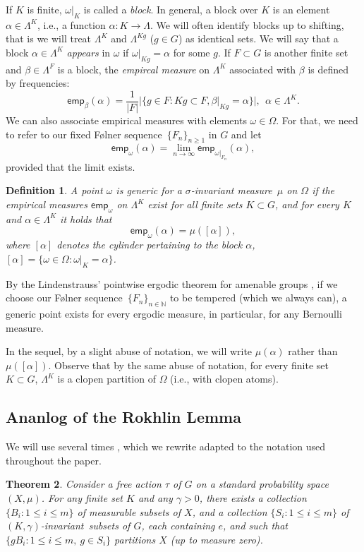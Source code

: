 \documentclass{amsart}
\newtheorem{thm}{Theorem}[section]
\newtheorem{defn}[thm]{Definition}
\theoremstyle{remark}
\def \N {\mathbb N}
\def \sq {sequence}
\def \im {invariant measure}
\def \inv {invariant}
\def \emp{\mathsf{emp}}
\begin{document}
If $K$ is finite, $\omega|_K$ is called a \emph{block}. In general, a block over $K$ is an element $\alpha\in\Lambda^K$, i.e., a function $\alpha:K\to\Lambda$. We will often identify blocks up to shifting, that is we will treat $\Lambda^K$ and $\Lambda^{Kg}$ ($g\in G$) as identical sets.
We will say that a block $\alpha\in\Lambda^K$ \emph{appears} in $\omega$ if $\omega|_{Kg}=\alpha$ for some $g$. If $F\subset G$ is another finite set and $\beta\in\Lambda^F$ is a block, the \emph{empircal measure} on $\Lambda^K$ associated with $\beta$ is defined by frequencies:
$$
\emp_\beta(\alpha)=\frac1{|F|}|\{g\in F: Kg\subset F, \beta|_{Kg}=\alpha\}|, \ \ \alpha\in\Lambda^K.
$$
We can also associate empirical measures with elements $\omega\in\Omega$. For that, we need to refer to our fixed F\o lner \sq\ $\{F_n\}_{n\ge1}$ in $G$ and let
$$
\emp_\omega(\alpha)=\lim_{n\to\infty}\emp_{\omega|_{F_n}}(\alpha),
$$
provided that the limit exists. 
\begin{defn}\label{gen}
A point $\omega$ is \emph{generic} for a $\sigma$-\im\ $\mu$ on $\Omega$ if the empirical measures $\emp_\omega$ on $\Lambda^K$ exist for all finite sets $K\subset G$, and for every $K$ and $\alpha\in\Lambda^K$ it holds that
$$
\emp_\omega(\alpha) = \mu([\alpha]),
$$ 
where $[\alpha]$ denotes the \emph{cylinder} pertaining to the block $\alpha$, $[\alpha]=\{\omega\in\Omega:\omega|_K=\alpha\}$. 
\end{defn}
By the Lindenstrauss' pointwise ergodic theorem for amenable groups \cite[Theorem~1.3]{6a}, if we choose our F\o lner \sq\ $\{F_n\}_{n\in\N}$ to be tempered (which we always can), a generic point exists for every ergodic measure, in particular, for any Bernoulli measure.
\smallskip

In the sequel, by a slight abuse of notation, we will write $\mu(\alpha)$ rather than $\mu([\alpha])$. Observe that by the same abuse of notation, for every finite set $K\subset G$, $\Lambda^K$ is a clopen partition of $\Omega$ (i.e., with clopen atoms). 

\subsection{Ananlog of the Rokhlin Lemma} We will use several times \cite[Theorem~3.6]{2a}, which we rewrite adapted to the notation used throughout the paper. 
\begin{thm}\label{conley}
Consider a free action $\tau$ of $G$ on a standard probability space $(X,\mu)$.
For any finite set $K$ and any $\gamma>0$, there exists a collection $\{B_i: 1\le i\le m\}$ of measurable subsets of $X$, and a 
collection $\{S_i: 1\le i\le m\}$ of $(K,\gamma)$-\inv\ subsets of $G$, each containing $e$, and such that $\{gB_i:1\le i\le m,\ g\in S_i\}$ partitions $X$ (up to measure zero).
\end{thm}
\end{document}
